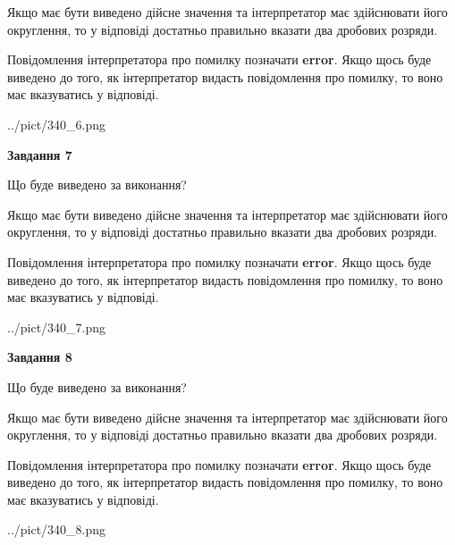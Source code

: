 \documentclass[12pt, ukrainian]{article}
\begin{document}
{\begin {Large}
Якщо має бути виведено дійсне значення та інтерпретатор має здійснювати його округлення, 
то у відповіді достатньо правильно вказати два дробових розряди.

Повідомлення інтерпретатора про помилку позначати \textbf{error}.
Якщо щось буде виведено до того, як інтерпретатор видасть повідомлення про помилку, 
то воно має вказуватись у відповіді. \par

\begin{center}
	{../pict/340_6.png}
\end{center}
\newpage

{\begin {center}\textbf{Завдання 7}\end {center}}\par
Що буде виведено за виконання? \par

Якщо має бути виведено дійсне значення та інтерпретатор має здійснювати його округлення, 
то у відповіді достатньо правильно вказати два дробових розряди.

Повідомлення інтерпретатора про помилку позначати \textbf{error}.
Якщо щось буде виведено до того, як інтерпретатор видасть повідомлення про помилку, 
то воно має вказуватись у відповіді. \par

\begin{center}
	{../pict/340_7.png}
\end{center}
\newpage

{\begin {center}\textbf{Завдання 8}\end {center}}\par
Що буде виведено за виконання? \par

Якщо має бути виведено дійсне значення та інтерпретатор має здійснювати його округлення, 
то у відповіді достатньо правильно вказати два дробових розряди.

Повідомлення інтерпретатора про помилку позначати \textbf{error}.
Якщо щось буде виведено до того, як інтерпретатор видасть повідомлення про помилку, 
то воно має вказуватись у відповіді. \par

\begin{center}
	{../pict/340_8.png}
\end{center}
\newpage


\end{Large}}
\end{document}
